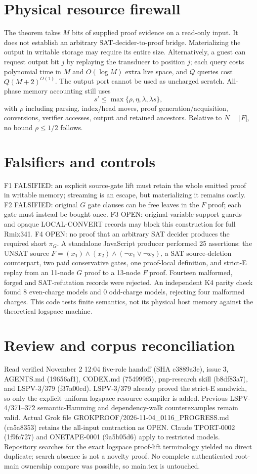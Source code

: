 \documentclass{article}
\begin{document}
\section*{Physical resource firewall}
The theorem takes $M$ bits of supplied proof evidence on a read-only input. It does not establish an arbitrary SAT-decider-to-proof bridge. Materializing the output in writable storage may require its entire size. Alternatively, a guest can request output bit $j$ by replaying the transducer to position $j$; each query costs polynomial time in $M$ and $O(\log M)$ extra live space, and $Q$ queries cost $Q(M+2)^{O(1)}$. The output port cannot be used as uncharged scratch. All-phase memory accounting still uses
\[ s'\le\max\{\rho,\eta,\lambda,\lambda s\}, \]
with $\rho$ including parsing, index/head moves, proof generation/acquisition, conversions, verifier accesses, output and retained ancestors. Relative to $N=|F|$, no bound $\rho\le1/2$ follows.
\section*{Falsifiers and controls}
\noindent F1 FALSIFIED: an explicit source-gate lift must retain the whole emitted proof in writable memory; streaming is an escape, but materializing it remains costly. F2 FALSIFIED: original $G$ gate clauses can be free leaves in the $F$ proof; each gate must instead be bought once. F3 OPEN: original-variable-support guards and opaque LOCAL-CONVERT records may block this construction for full Rmix341. F4 OPEN: no proof that an arbitrary SAT decider produces the required short $\pi_G$.
A standalone JavaScript producer performed 25 assertions: the UNSAT source $F=(x_1)\wedge(x_2)\wedge(\neg x_1\vee\neg x_2)$, a SAT source-deletion counterpart, two paid conservative gates, one proof-local definition, and strict-E replay from an 11-node $G$ proof to a 13-node $F$ proof. Fourteen malformed, forged and SAT-refutation records were rejected. An independent K4 parity check found 8 even-charge models and 0 odd-charge models, rejecting four malformed charges. This code tests finite semantics, not its physical host memory against the theoretical logspace machine.
\section*{Review and corpus reconciliation}
Read verified November 2 12:04 five-role handoff (SHA c3889a3e), issue 3, AGENTS.md (19656af1), CODEX.md (754999f5), pnp-research skill (b8df83a7), and LSPV-3/379 (f37a00cd). LSPV-3/379 already proved the strict-E sandwich, so only the explicit uniform logspace resource compiler is added. Previous LSPV-4/371--372 semantic-Hamming and dependency-walk counterexamples remain valid. Actual Grok file GROKPROOF/2026-11-04_0116_PROGRESS.md (ca5a8353) retains the all-input contraction as OPEN. Claude TPORT-0002 (1f9fc727) and ONETAPE-0001 (9a5b05d6) apply to restricted models. Repository searches for the exact logspace proof-lift terminology yielded no direct duplicate; search absence is not a novelty proof. No complete authenticated root-main ownership compare was possible, so main.tex is untouched.
\end{document}
